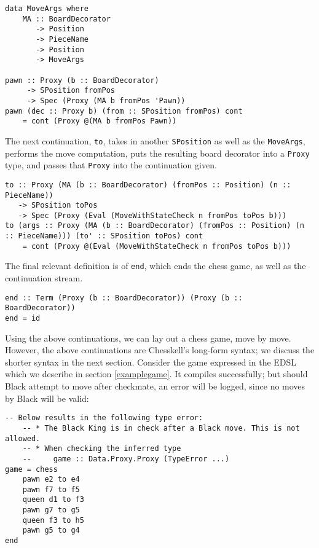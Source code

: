 \documentclass[12pt, a4paper, bibliography=totocnumbered]{scrreprt}
\newcommand{\inline}[1]{\lstinline[basicstyle=\ttfamily\footnotesize]{#1}}
\begin{document}
\begin{lstlisting}
data MoveArgs where
    MA :: BoardDecorator
       -> Position
       -> PieceName
       -> Position
       -> MoveArgs

pawn :: Proxy (b :: BoardDecorator)
     -> SPosition fromPos
     -> Spec (Proxy (MA b fromPos 'Pawn))
pawn (dec :: Proxy b) (from :: SPosition fromPos) cont
    = cont (Proxy @(MA b fromPos Pawn))
\end{lstlisting}

The next continuation, \inline{to}, takes in another \inline{SPosition} as well as the \lstinline{MoveArgs}, performs the move computation, puts the resulting board decorator into a \inline{Proxy} type, and passes that \inline{Proxy} into the continuation given.

\begin{lstlisting}
to :: Proxy (MA (b :: BoardDecorator) (fromPos :: Position) (n :: PieceName))
   -> SPosition toPos
   -> Spec (Proxy (Eval (MoveWithStateCheck n fromPos toPos b)))
to (args :: Proxy (MA (b :: BoardDecorator) (fromPos :: Position) (n :: PieceName))) (to' :: SPosition toPos) cont
    = cont (Proxy @(Eval (MoveWithStateCheck n fromPos toPos b)))
\end{lstlisting}

The final relevant definition is of \inline{end}, which ends the chess game, as well as the continuation stream.

\begin{lstlisting}
end :: Term (Proxy (b :: BoardDecorator)) (Proxy (b :: BoardDecorator))
end = id
\end{lstlisting}

Using the above continuations, we can lay out a chess game, move by move. However, the above continuations are Chesskell's long-form syntax; we discuss the shorter syntax in the next section. Consider the game expressed in the EDSL which we describe in section \ref{examplegame}. It compiles successfully; but should Black attempt to move after checkmate, an error will be logged, since no moves by Black will be valid:

\begin{lstlisting}
-- Below results in the following type error:
    -- * The Black King is in check after a Black move. This is not allowed.
    -- * When checking the inferred type
    --     game :: Data.Proxy.Proxy (TypeError ...)
game = chess
    pawn e2 to e4
    pawn f7 to f5
    queen d1 to f3
    pawn g7 to g5
    queen f3 to h5
    pawn g5 to g4
end
\end{lstlisting}
\end{document}
